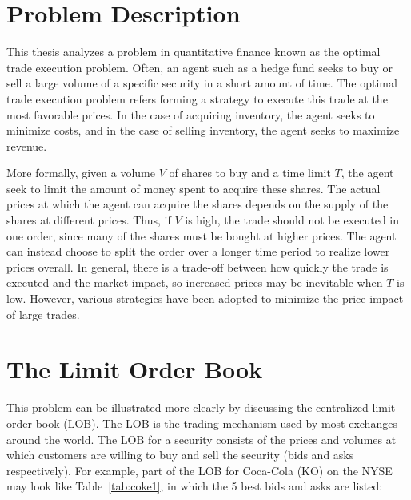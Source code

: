 \section{Problem Description} \label{ch:problemdescription}

This thesis analyzes a problem in quantitative finance known as the optimal trade execution problem. Often, an agent such as a hedge fund seeks to buy or sell a large volume of a specific security in a short amount of time. The optimal trade execution problem refers forming a strategy to execute this trade at the most favorable prices. In the case of acquiring inventory, the agent seeks to minimize costs, and in the case of selling inventory, the agent seeks to maximize revenue.

More formally, given a volume $V$ of shares to buy and a time limit $T$, the agent seek to limit the amount of money spent to acquire these shares. The actual prices at which the agent can acquire the shares depends on the supply of the shares at different prices. Thus, if $V$ is high, the trade should not be executed in one order, since many of the shares must be bought at higher prices. The agent can instead choose to split the order over a longer time period to realize lower prices overall. In general, there is a trade-off between how quickly the trade is executed and the market impact, so increased prices may be inevitable when $T$ is low. However, various strategies have been adopted to minimize the price impact of large trades.

\section{The Limit Order Book} \label{ch:background}
This problem can be illustrated more clearly by discussing the centralized limit order book (LOB). The LOB is the trading mechanism used by most exchanges around the world. The LOB for a security consists of the prices and volumes at which customers are willing to buy and sell the security (bids and asks respectively). For example, part of the LOB for Coca-Cola (KO) on the NYSE may look like Table~\ref{tab:coke1}, in which the 5 best bids and asks are listed:

